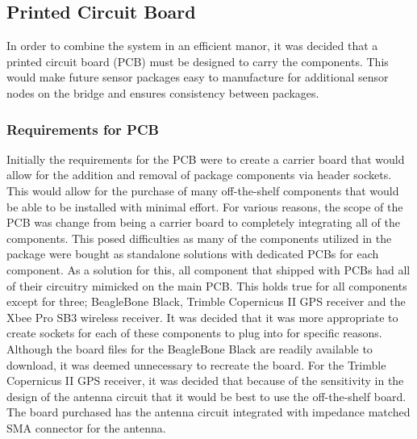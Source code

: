 \subsection{Printed Circuit Board}
In order to combine the system in an efficient manor, it was decided that a printed circuit board (PCB) must be designed to carry the components.
This would make future sensor packages easy to manufacture for additional sensor nodes on the bridge and ensures consistency between packages.
\subsubsection{Requirements for PCB}
Initially the requirements for the PCB were to create a carrier board that would allow for the addition and removal of package components via header sockets.
This would allow for the purchase of many off-the-shelf components that would be able to be installed with minimal effort.
For various reasons, the scope of the PCB was change from being a carrier board to completely integrating all of the components.
This posed difficulties as many of the components utilized in the package were bought as standalone solutions with dedicated PCBs for each component.
As a solution for this, all component that shipped with PCBs had all of their circuitry mimicked on the main PCB.
This holds true for all components except for three; BeagleBone Black, Trimble Copernicus II GPS receiver and the Xbee Pro SB3 wireless receiver.
It was decided that it was more appropriate to create sockets for each of these components to plug into for specific reasons.
Although the board files for the BeagleBone Black are readily available to download, it was deemed unnecessary to recreate the board.
For the Trimble Copernicus II GPS receiver, it was decided that because of the sensitivity in the design of the antenna circuit that it would be best to use the off-the-shelf board.
The board purchased has the antenna circuit integrated with impedance matched SMA connector for the antenna.

\label{sec:PCB}